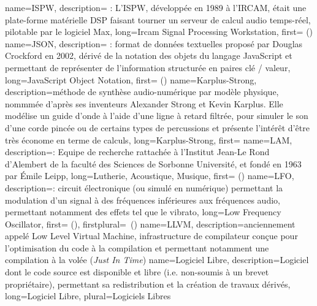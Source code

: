 {
    name={ISPW},
    description={\textit{} : L'ISPW, développée en 1989 à l'\gls{IRCAM}, était une plate-forme matérielle \gls{DSP} faisant tourner un serveur de calcul audio temps-réel, pilotable par le logiciel Max},
    long={Ircam Signal Processing Workstation},
    first={ ()}
}
{
    name={JSON},
    description={\textit{} : format de données textuelles proposé par Douglas Crockford en 2002, dérivé de la notation des objets du langage JavaScript et permettant de représenter de l’information structurée en paires clé / valeur},
    long={JavaScript Object Notation},
    first={ ()}
}
{
    name={Karplus-Strong},
    description={méthode de synthèse audio-numérique par modèle physique, nommmée d'après ses inventeurs Alexander Strong et Kevin Karplus. Elle modélise un guide d'onde à l'aide d'une ligne à retard filtrée, pour simuler le son d'une corde pincée ou de certains types de percussions et présente l'intérêt d'être très économe en terme de calculs},
    long={Karplus-Strong},
    first={}
}
{
    name={LAM},
    description={\textit{}: Equipe de recherche rattachée à l'Institut Jean-Le Rond d'Alembert de la faculté des Sciences de Sorbonne Université, et fondé en 1963 par Émile Leipp},
    long={Lutherie, Acoustique, Musique},
    first={ ()}
}
{
    name={LFO},
    description={\textit{}: circuit électronique (ou simulé en numérique) permettant la modulation d'un signal à des fréquences inférieures aux fréquences audio, permettant notamment des effets tel que le vibrato},
    long={Low Frequency Oscillator},
    first={ ()},
    firstplural={\glspluralsuffix\ (\glspluralsuffix)}
}
{
    name={LLVM},
    description={anciennement appelé Low Level Virtual Machine, infrastructure de compilateur conçue pour l'optimisation du code à la compilation et permettant notamment une compilation à la volée (\textit{Just In Time})}
}
{
    name={Logiciel Libre},
    description={Logiciel dont le code source est disponible et libre (i.e. non-soumis à un brevet propriétaire), permettant sa redistribution et la création de travaux dérivés},
    long={Logiciel Libre},
    plural={Logiciels Libres}
}
